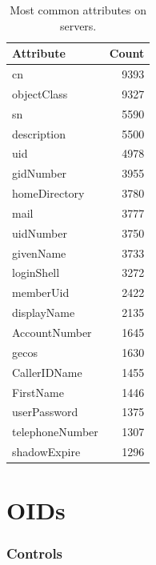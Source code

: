 \begin{table}[htbp]
\centering
\begin{tabular}{@{} lr @{}}
\toprule
\textbf{Attribute} & \textbf{Count} \\
\midrule
\midrule
cn & 9393 \\
objectClass & 9327 \\
sn & 5590 \\
description & 5500 \\
uid & 4978 \\
gidNumber & 3955 \\
homeDirectory & 3780 \\
mail & 3777 \\
uidNumber & 3750 \\
givenName & 3733 \\
loginShell & 3272 \\
memberUid & 2422 \\
displayName & 2135 \\
AccountNumber & 1645 \\
gecos & 1630 \\
CallerIDName & 1455 \\
FirstName & 1446 \\
userPassword & 1375 \\
telephoneNumber & 1307 \\
shadowExpire & 1296 \\

\bottomrule
\end{tabular}
\caption{Most common attributes on servers.}
\label{tab:Most common attributes on servers.}
\end{table}




\section{OIDs}

\subsubsection{Controls}

